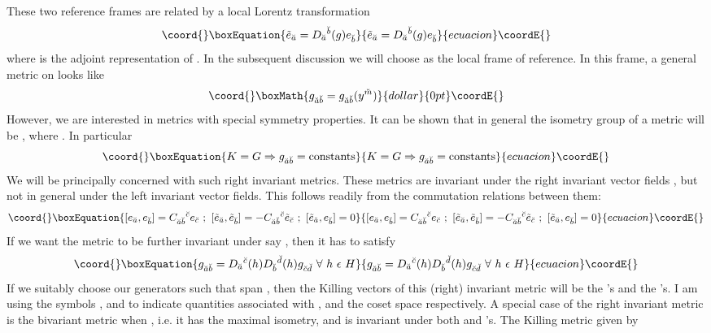\documentclass[a4paper,12pt]{article}
\begin{document}
These two reference frames are related by a local Lorentz transformation
\begin{equation}\coord{}\boxEquation{
\et_{\as}=D_{\as}{}^{\bs}(g)e_{\bs}
}{
\et_{\as}=D_{\as}{}^{\bs}(g)e_{\bs}
}{ecuacion}\coordE{}\end{equation}
where \coordHE{} is the adjoint representation of \coordHE{}. In the subsequent discussion we will choose \coordHE{} as the local frame of reference. In this frame, a general metric on \coordHE{} looks like
$$\coord{}\boxMath{ g_{\as\bs}=g_{\as\bs}(y^{\ms})}{dollar}{0pt}\coordE{}$$
However, we are interested in metrics with special symmetry properties. It can be shown that in general the isometry group of a metric will be \coordHE{}, where \coordHE{}. In particular \begin{equation}\coord{}\boxEquation{
K=G \Ra g_{\as\bs}=\mbox{constants}
}{
K=G \Ra g_{\as\bs}=\mbox{constants}
}{ecuacion}\coordE{}\end{equation}
We will be principally concerned with such right invariant metrics. These metrics are invariant under the right invariant vector fields \myHighlight{$\{\et_{\as}\}$}\coordHE{}, but not in general under the left invariant vector fields. This follows readily from the commutation relations between them:
\begin{equation}\coord{}\boxEquation{
[e_{\as},e_{\bs}]=C_{\as\bs}{}^{\cs}e_{\cs}\ ;\ [\et_{\as},\et_{\bs}]=-C_{\as\bs}{}^{\cs}\et_{\cs}\ ;\ [\et_{\as},e_{\bs}]=0
}{
[e_{\as},e_{\bs}]=C_{\as\bs}{}^{\cs}e_{\cs}\ ;\ [\et_{\as},\et_{\bs}]=-C_{\as\bs}{}^{\cs}\et_{\cs}\ ;\ [\et_{\as},e_{\bs}]=0
}{ecuacion}\coordE{}\end{equation}
If we want the metric to be further invariant under say \coordHE{}, then it has to satisfy
\begin{equation}\coord{}\boxEquation{
g_{\as\bs}=D_{\as}{}^{\cs}(h)D_{\bs}{}^{\ds}(h)g_{\cs\ds}\ \forall\  h\ \e \ H
}{
g_{\as\bs}=D_{\as}{}^{\cs}(h)D_{\bs}{}^{\ds}(h)g_{\cs\ds}\ \forall\  h\ \e \ H
}{ecuacion}\coordE{}\end{equation}
If we suitably choose our generators \coordHE{} such that \coordHE{} span \coordHE{}, then the Killing vectors of this \coordHE{} (right) invariant metric will be the \myHighlight{$\{\et_{\as}\}$}\coordHE{}'s and the \coordHE{}'s. I am using the symbols \myHighlight{$\breve{},\ \dot{}$}\coordHE{}, and \myHighlight{$\grave{}$}\coordHE{} to indicate quantities associated with \coordHE{}, \coordHE{} and the coset space \coordHE{} respectively. A special case of the right invariant metric is the bivariant metric when \coordHE{}, i.e. it has the maximal isometry, and is invariant under both \myHighlight{$\{\et_{\as}\}$}\coordHE{} and \coordHE{}'s. The Killing metric given by
\end{document}
